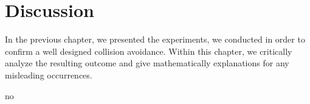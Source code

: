 \chapter{Discussion}
\label{chap:discussion}

In the previous chapter, we presented the experiments, we conducted in order to confirm a well designed collision avoidance.  Within this chapter, we critically analyze the resulting outcome and give mathematically explanations for any misleading occurrences. 

\sec



no